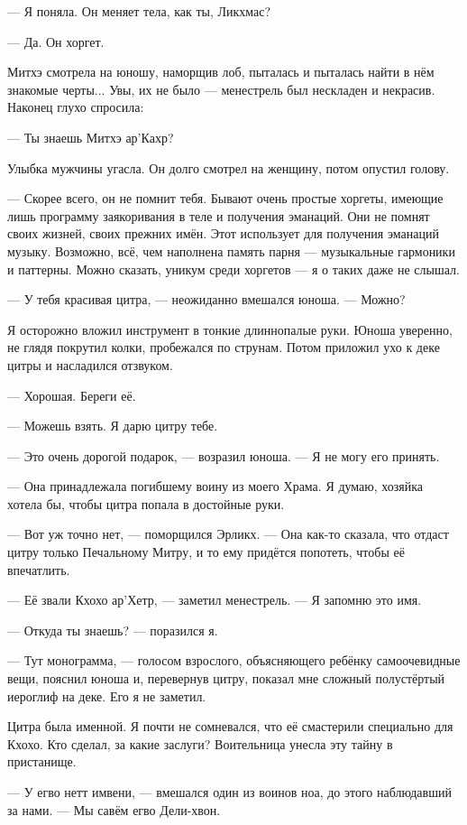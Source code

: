 --- Я поняла.
Он меняет тела, как ты, Ликхмас?

--- Да.
Он хоргет.

Митхэ смотрела на юношу, наморщив лоб, пыталась и пыталась найти в нём знакомые черты...
Увы, их не было --- менестрель был нескладен и некрасив.
Наконец глухо спросила:

--- Ты знаешь Митхэ ар’Кахр?

Улыбка мужчины угасла.
Он долго смотрел на женщину, потом опустил голову.

--- Скорее всего, он не помнит тебя.
Бывают очень простые хоргеты, имеющие лишь программу заякоривания в теле и получения эманаций.
Они не помнят своих жизней, своих прежних имён.
Этот использует для получения эманаций музыку.
Возможно, всё, чем наполнена память парня --- музыкальные гармоники и паттерны.
Можно сказать, уникум среди хоргетов --- я о таких даже не слышал.

--- У тебя красивая цитра, --- неожиданно вмешался юноша.
--- Можно?

Я осторожно вложил инструмент в тонкие длиннопалые руки.
Юноша уверенно, не глядя покрутил колки, пробежался по струнам.
Потом приложил ухо к деке цитры и насладился отзвуком.

--- Хорошая.
Береги её.

--- Можешь взять.
Я дарю цитру тебе.

--- Это очень дорогой подарок, --- возразил юноша.
--- Я не могу его принять.

--- Она принадлежала погибшему воину из моего Храма.
Я думаю, хозяйка хотела бы, чтобы цитра попала в достойные руки.

--- Вот уж точно нет, --- поморщился Эрликх.
--- Она как-то сказала, что отдаст цитру только Печальному Митру, и то ему придётся попотеть, чтобы её впечатлить.

--- Её звали Кхохо ар’Хетр, --- заметил менестрель.
--- Я запомню это имя.

--- Откуда ты знаешь? --- поразился я.

--- Тут монограмма, --- голосом взрослого, объясняющего ребёнку самоочевидные вещи, пояснил юноша и, перевернув цитру, показал мне сложный полустёртый иероглиф на деке.
Его я не заметил.

Цитра была именной.
Я почти не сомневался, что её смастерили специально для Кхохо.
Кто сделал, за какие заслуги?
Воительница унесла эту тайну в пристанище.

--- У егво нетт имвени, --- вмешался один из воинов ноа, до этого наблюдавший за нами.
--- Мы савём егво Дели-хвон.

